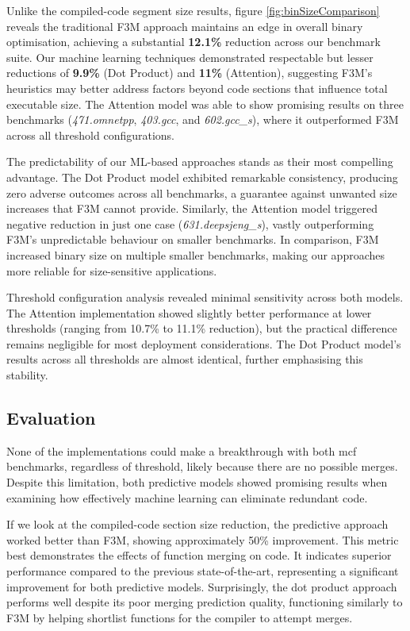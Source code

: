 Unlike the compiled-code segment size results, figure \ref{fig:binSizeComparison} reveals the traditional F3M approach maintains an edge in overall binary optimisation, achieving a substantial \textbf{12.1\%} reduction across our benchmark suite. Our machine learning techniques demonstrated respectable but lesser reductions of \textbf{9.9\%} (Dot Product) and \textbf{11\%} (Attention), suggesting F3M's heuristics may better address factors beyond code sections that influence total executable size. The Attention model was able to show promising results on three benchmarks (\textit{471.omnetpp}, \textit{403.gcc}, and \textit{602.gcc\_s}), where it outperformed F3M across all threshold configurations.

The predictability of our ML-based approaches stands as their most compelling advantage. The Dot Product model exhibited remarkable consistency, producing zero adverse outcomes across all benchmarks, a guarantee against unwanted size increases that F3M cannot provide. Similarly, the Attention model triggered negative reduction in just one case (\textit{631.deepsjeng\_s}), vastly outperforming F3M's unpredictable behaviour on smaller benchmarks. In comparison, F3M increased binary size on multiple smaller benchmarks, making our approaches more reliable for size-sensitive applications.

Threshold configuration analysis revealed minimal sensitivity across both models. The Attention implementation showed slightly better performance at lower thresholds (ranging from 10.7\% to 11.1\% reduction), but the practical difference remains negligible for most deployment considerations. The Dot Product model's results across all thresholds are almost identical, further emphasising this stability.

\subsection{Evaluation}
None of the implementations could make a breakthrough with both mcf benchmarks, regardless of threshold, likely because there are no possible merges. Despite this limitation, both predictive models showed promising results when examining how effectively machine learning can eliminate redundant code.

If we look at the compiled-code section size reduction, the predictive approach worked better than F3M, showing approximately 50\% improvement. This metric best demonstrates the effects of function merging on code. It indicates superior performance compared to the previous state-of-the-art, representing a significant improvement for both predictive models. Surprisingly, the dot product approach performs well despite its poor merging prediction quality, functioning similarly to F3M by helping shortlist functions for the compiler to attempt merges.

